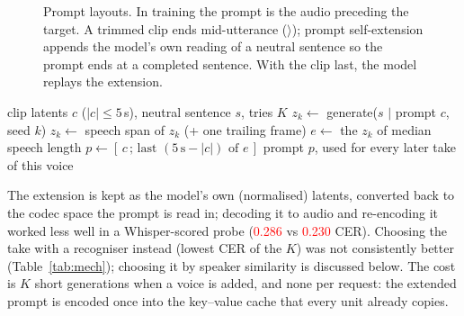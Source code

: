 \documentclass[conference]{IEEEtran}
\newcommand{\RES}[1]{\textcolor{red}{#1}}
\begin{document}
\begin{figure}[t]
\centering
{}
\caption{Prompt layouts. In training the prompt is the audio preceding the target. A trimmed clip ends
mid-utterance ($\rangle$); prompt self-extension appends the model's own reading of a neutral sentence so
the prompt ends at a completed sentence. With the clip last, the model replays the extension.}
\label{fig:layout}
\end{figure}

\begin{algorithm}[t]
\caption{Prompt self-extension (once per voice)}\label{alg:ext}
\begin{algorithmic}[1]
\REQUIRE clip latents $c$ ($|c|\le 5$\,s), neutral sentence $s$, tries $K$
  \STATE $z_k \gets$ generate($s$ $\mid$ prompt $c$, seed $k$)
  \STATE $z_k \gets$ speech span of $z_k$ (+ one trailing frame)
\ENDFOR
\STATE $e \gets$ the $z_k$ of median speech length 
\STATE $p \gets [\,c \,;\, \text{last } (5\,\text{s} - |c|) \text{ of } e\,]$ 
\ENSURE prompt $p$, used for every later take of this voice
\end{algorithmic}
\end{algorithm}

The extension is kept as the model's own (normalised) latents, converted back to the codec space the
prompt is read in; decoding it to audio and re-encoding it worked less well in a Whisper-scored probe (\RES{0.286} vs
\RES{0.230} CER).
Choosing the take with a recogniser instead (lowest CER of the $K$) was not consistently
better (Table~\ref{tab:mech}); choosing it by speaker similarity is discussed below. The cost is $K$ short generations when a voice is added, and none per request: the extended prompt is
encoded once into the key--value cache that every unit already copies.
\end{document}
